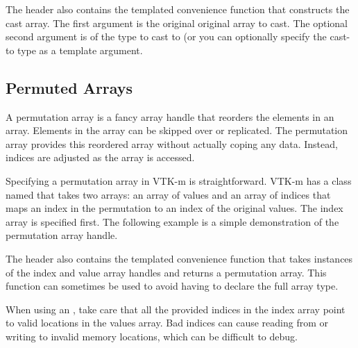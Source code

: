 
The  header also contains the
templated convenience function  that
constructs the cast array. The first argument is the original
 original array to cast. The optional second
argument is of the type to cast to (or you can optionally specify the
cast-to type as a template argument.



\subsection{Permuted Arrays}
\label{sec:PermutedArrays}


A permutation array is a fancy array handle that reorders the elements in
an array. Elements in the array can be skipped over or replicated. The
permutation array provides this reordered array without actually coping any
data. Instead, indices are adjusted as the array is accessed.

Specifying a permutation array in VTK-m is straightforward. VTK-m has a
class named  that takes two arrays: an
array of values and an array of indices that maps an index in the
permutation to an index of the original values. The index array is
specified first. The following example is a simple demonstration of the
permutation array handle.


The  header also contains the
templated convenience function  that
takes instances of the index and value array handles and returns a
permutation array. This function can sometimes be used to avoid having to
declare the full array type.


\begin{commonerrors}
  When using an , take care that all
  the provided indices in the index array point to valid locations in the
  values array. Bad indices can cause reading from or writing to invalid
  memory locations, which can be difficult to debug.
\end{commonerrors}

